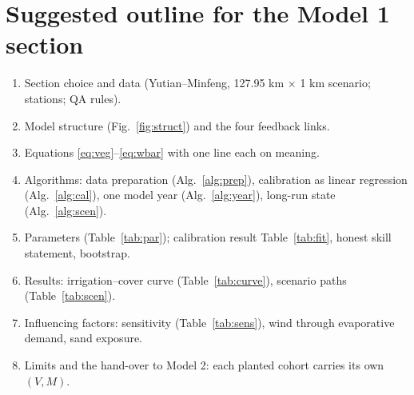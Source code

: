 \documentclass[11pt,a4paper]{article}
\begin{document}
\section{Suggested outline for the Model 1 section}
\begin{enumerate}
\item Section choice and data (Yutian--Minfeng, 127.95 km $\times$ 1 km scenario; stations; QA rules).
\item Model structure (Fig.~\ref{fig:struct}) and the four feedback links.
\item Equations \eqref{eq:veg}--\eqref{eq:wbar} with one line each on meaning.
\item Algorithms: data preparation (Alg.~\ref{alg:prep}), calibration as linear regression (Alg.~\ref{alg:cal}), one model year (Alg.~\ref{alg:year}), long-run state (Alg.~\ref{alg:scen}).
\item Parameters (Table~\ref{tab:par}); calibration result Table~\ref{tab:fit}, honest skill statement, bootstrap.
\item Results: irrigation--cover curve (Table~\ref{tab:curve}), scenario paths (Table~\ref{tab:scen}).
\item Influencing factors: sensitivity (Table~\ref{tab:sens}), wind through evaporative demand, sand exposure.
\item Limits and the hand-over to Model 2: each planted cohort carries its own $(V,M)$.
\end{enumerate}
\end{document}
